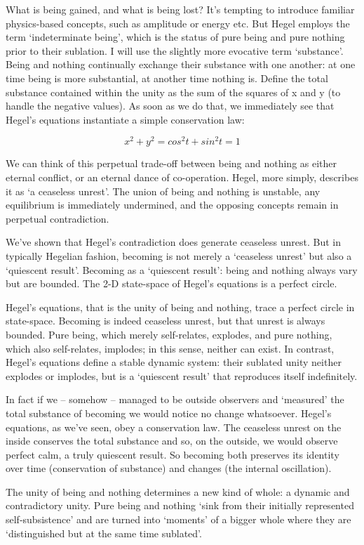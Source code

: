 \documentclass[
]{book}
\begin{document}
What is being gained, and what is being lost? It's tempting to introduce familiar physics-based concepts, such as amplitude or energy etc. But Hegel employs the term `indeterminate being', which is the status of pure being and pure nothing prior to their sublation. I will use the slightly more evocative term `substance'. Being and nothing continually exchange their substance with one another: at one time being is more substantial, at another time nothing is. Define the total substance contained within the unity as the sum of the squares of x and y (to handle the negative values). As soon as we do that, we immediately see that Hegel's equations instantiate a simple conservation law:

\[x^{2} + y^{2} = cos^{2}t + sin^{2}t = 1\]

We can think of this perpetual trade-off between being and nothing as either eternal conflict, or an eternal dance of co-operation. Hegel, more simply, describes it as `a ceaseless unrest'. The union of being and nothing is unstable, any equilibrium is immediately undermined, and the opposing concepts remain in perpetual contradiction.

We've shown that Hegel's contradiction does generate ceaseless unrest. But in typically Hegelian fashion, becoming is not merely a `ceaseless unrest' but also a `quiescent result'.
Becoming as a `quiescent result': being and nothing always vary but are bounded. The 2-D state-space of Hegel's equations is a perfect circle.

Hegel's equations, that is the unity of being and nothing, trace a perfect circle in state-space. Becoming is indeed ceaseless unrest, but that unrest is always bounded. Pure being, which merely self-relates, explodes, and pure nothing, which also self-relates, implodes; in this sense, neither can exist. In contrast, Hegel's equations define a stable dynamic system: their sublated unity neither explodes or implodes, but is a `quiescent result' that reproduces itself indefinitely.

In fact if we -- somehow -- managed to be outside observers and `measured' the total substance of becoming we would notice no change whatsoever. Hegel's equations, as we've seen, obey a conservation law. The ceaseless unrest on the inside conserves the total substance and so, on the outside, we would observe perfect calm, a truly quiescent result. So becoming both preserves its identity over time (conservation of substance) and changes (the internal oscillation).

The unity of being and nothing determines a new kind of whole: a dynamic and contradictory unity. Pure being and nothing `sink from their initially represented self-subsistence' and are turned into `moments' of a bigger whole where they are `distinguished but at the same time sublated'.
\end{document}
